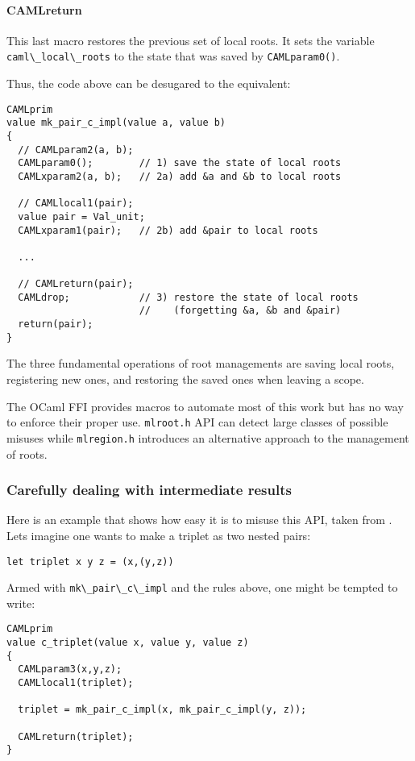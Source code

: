 \documentclass[a4paper]{easychair}
\newcommand{\cpp}[1]{\lstinline[style=C++]{#1}}
\begin{document}
\paragraph{CAMLreturn} This last macro restores the previous set of local
roots. It sets the variable \cpp{caml\_local\_roots} to the state that was
saved by \cpp{CAMLparam0()}.

Thus, the code above can be desugared to the equivalent:
%
\begin{lstlisting}[]
CAMLprim
value mk_pair_c_impl(value a, value b)
{
  // CAMLparam2(a, b);
  CAMLparam0();        // 1) save the state of local roots
  CAMLxparam2(a, b);   // 2a) add &a and &b to local roots

  // CAMLlocal1(pair);
  value pair = Val_unit;
  CAMLxparam1(pair);   // 2b) add &pair to local roots

  ...
  
  // CAMLreturn(pair);
  CAMLdrop;            // 3) restore the state of local roots
                       //    (forgetting &a, &b and &pair)
  return(pair);
}
\end{lstlisting}

The three fundamental operations of root managements are saving local roots,
registering new ones, and restoring the saved ones when leaving a scope.

The OCaml FFI provides macros to automate most of this work but has no way to enforce their proper use. \cpp{mlroot.h} API can detect large classes of possible misuses while \cpp{mlregion.h} introduces an alternative approach to the management of roots. 

\subsubsection{Carefully dealing with intermediate results}

Here is an example that shows how easy it is to misuse this API, taken from
\citep[caml-oxide]{camloxide}.  Lets imagine one wants to make a triplet as two nested pairs:
%
\begin{lstlisting}[]
let triplet x y z = (x,(y,z))
\end{lstlisting}

Armed with \cpp{mk\_pair\_c\_impl} and the rules above, one might 
be tempted to write:
%
\begin{lstlisting}[style=C++]
CAMLprim
value c_triplet(value x, value y, value z)
{
  CAMLparam3(x,y,z);
  CAMLlocal1(triplet);

  triplet = mk_pair_c_impl(x, mk_pair_c_impl(y, z));

  CAMLreturn(triplet);
}
\end{lstlisting}
\end{document}

